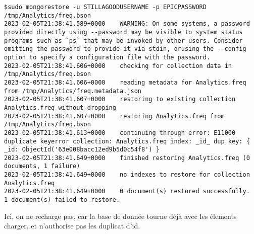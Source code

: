 \documentclass{article}
\begin{document}
\begin{lstlisting}
$sudo mongorestore -u STILLAGOODUSERNAME -p EPICPASSWORD /tmp/Analytics/freq.bson
2023-02-05T21:38:41.589+0000	WARNING: On some systems, a password provided directly using --password may be visible to system status programs such as `ps` that may be invoked by other users. Consider omitting the password to provide it via stdin, orusing the --config option to specify a configuration file with the password.
2023-02-05T21:38:41.606+0000	checking for collection data in /tmp/Analytics/freq.bson
2023-02-05T21:38:41.606+0000	reading metadata for Analytics.freq from /tmp/Analytics/freq.metadata.json
2023-02-05T21:38:41.607+0000	restoring to existing collection Analytics.freq without dropping
2023-02-05T21:38:41.607+0000	restoring Analytics.freq from /tmp/Analytics/freq.bson
2023-02-05T21:38:41.613+0000	continuing through error: E11000 duplicate keyerror collection: Analytics.freq index: _id_ dup key: { _id: ObjectId('63e008bacc12ed9b5d0c54f8') }
2023-02-05T21:38:41.649+0000	finished restoring Analytics.freq (0 documents, 1 failure)
2023-02-05T21:38:41.649+0000	no indexes to restore for collection Analytics.freq
2023-02-05T21:38:41.649+0000	0 document(s) restored successfully. 
1 document(s) failed to restore.
\end{lstlisting}

Ici, on ne recharge pas, car la base de donnée tourne déjà avec les élements charger, et n'authorise 
pas les duplicat d'id.
\end{document}
